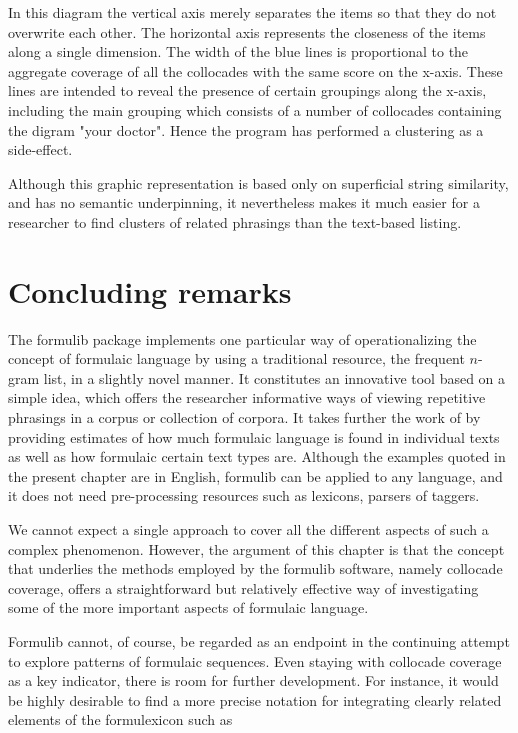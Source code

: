 \documentclass[output=paper]{langscibook}
\begin{document}
In this diagram the vertical axis merely separates the items so that they do not overwrite each other. The horizontal axis represents the closeness of the items along a single dimension. The width of the blue lines is proportional to the aggregate coverage of all the collocades with the same score on the x-axis. These lines are intended to reveal the presence of certain groupings along the x-axis, including the main grouping which consists of a number of collocades containing the digram "your doctor". Hence the program has performed a clustering as a side-effect.

Although this graphic representation is based only on superficial string similarity, and has no semantic underpinning, it nevertheless makes it much easier for a researcher to find clusters of related phrasings than the text-based listing.

\section{Concluding remarks}

The formulib package implements one particular way of operationalizing the concept of formulaic language by using a traditional resource, the frequent $n$-gram list, in a slightly novel manner. It constitutes an innovative tool based on a simple idea, which offers the researcher informative ways of viewing repetitive phrasings in a corpus or collection of corpora. It takes further the work of \citet{ForsythGrabowski2015} by providing estimates of how much formulaic language is found in individual texts as well as how formulaic certain text types are. Although the examples quoted in the present chapter are in English, formulib can be applied to any language, and it does not need pre-processing resources such as lexicons, parsers of taggers.

We cannot expect a single approach to cover all the different aspects of such a complex phenomenon. However, the argument of this chapter is that the concept that underlies the methods employed by the formulib software, namely collocade coverage, offers a straightforward but relatively effective way of investigating some of the more important aspects of formulaic language.

Formulib cannot, of course, be regarded as an endpoint in the continuing attempt to explore patterns of formulaic sequences. Even staying with collocade coverage as a key indicator, there is room for further development. For instance, it would be highly desirable to find a more precise notation for integrating clearly related elements of the formulexicon such as
\end{document}
